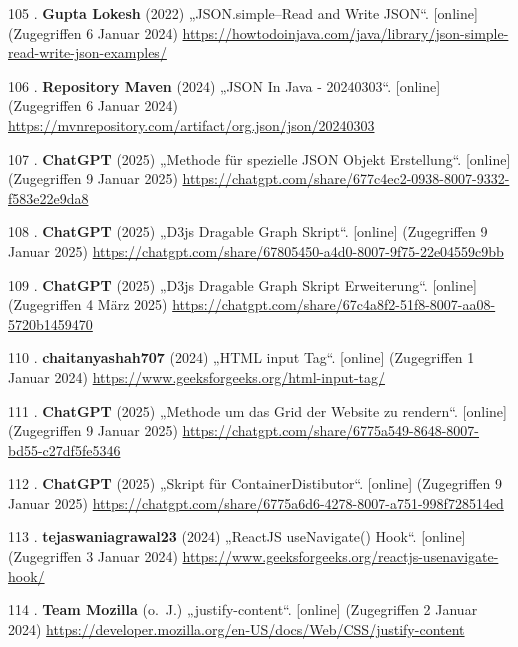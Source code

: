 \documentclass[
    headings=optiontotocandhead,%
    twoside,
    numbers=noenddot,%
    12pt, %
    titlepage, %
    parskip=full, %
    listof=leveldown, 
    numbers=noenddot, %
    a4paper,DIV=14,
    BCOR=15mm,
]{scrbook}
\newlength{\cslhangindent}
\newenvironment{cslreferences}%
  {\setlength{\parindent}{0pt}%
  \everypar{\setlength{\hangindent}{\cslhangindent}}\ignorespaces}%
  {\par}
\begin{document}
\begin{cslreferences}
\leavevmode\hypertarget{ref-HowToDoInJava-JSON}{}%
105 . \textbf{Gupta Lokesh} (2022) „JSON.simple--Read and Write JSON``.
{[}online{]} (Zugegriffen 6 Januar 2024)
\url{https://howtodoinjava.com/java/library/json-simple-read-write-json-examples/}

\leavevmode\hypertarget{ref-MavenRepository-JSON}{}%
106 . \textbf{Repository Maven} (2024) „JSON In Java - 20240303``.
{[}online{]} (Zugegriffen 6 Januar 2024)
\url{https://mvnrepository.com/artifact/org.json/json/20240303}

\leavevmode\hypertarget{ref-gpt-SpecificJson}{}%
107 . \textbf{ChatGPT} (2025) „Methode für spezielle JSON Objekt
Erstellung``. {[}online{]} (Zugegriffen 9 Januar 2025)
\url{https://chatgpt.com/share/677c4ec2-0938-8007-9332-f583e22e9da8}

\leavevmode\hypertarget{ref-gpt-D3jsDGScript}{}%
108 . \textbf{ChatGPT} (2025) „D3js Dragable Graph Skript``.
{[}online{]} (Zugegriffen 9 Januar 2025)
\url{https://chatgpt.com/share/67805450-a4d0-8007-9f75-22e04559c9bb}

\leavevmode\hypertarget{ref-gpt-D3jsDGScript-Erweiterung}{}%
109 . \textbf{ChatGPT} (2025) „D3js Dragable Graph Skript Erweiterung``.
{[}online{]} (Zugegriffen 4 März 2025)
\url{https://chatgpt.com/share/67c4a8f2-51f8-8007-aa08-5720b1459470}

\leavevmode\hypertarget{ref-GeeksForGeeks-HTMLInputTag}{}%
110 . \textbf{chaitanyashah707} (2024) „HTML input Tag``. {[}online{]}
(Zugegriffen 1 Januar 2024)
\url{https://www.geeksforgeeks.org/html-input-tag/}

\leavevmode\hypertarget{ref-gpt-renderGrid}{}%
111 . \textbf{ChatGPT} (2025) „Methode um das Grid der Website zu
rendern``. {[}online{]} (Zugegriffen 9 Januar 2025)
\url{https://chatgpt.com/share/6775a549-8648-8007-bd55-c27df5fe5346}

\leavevmode\hypertarget{ref-gpt-ContainerDistributorScript}{}%
112 . \textbf{ChatGPT} (2025) „Skript für ContainerDistibutor``.
{[}online{]} (Zugegriffen 9 Januar 2025)
\url{https://chatgpt.com/share/6775a6d6-4278-8007-a751-998f728514ed}

\leavevmode\hypertarget{ref-GeeksForGeeks-useNavigate}{}%
113 . \textbf{tejaswaniagrawal23} (2024) „ReactJS useNavigate() Hook``.
{[}online{]} (Zugegriffen 3 Januar 2024)
\url{https://www.geeksforgeeks.org/reactjs-usenavigate-hook/}

\leavevmode\hypertarget{ref-DeveloperMozilla-JustifyContent}{}%
114 . \textbf{Team Mozilla} (o.~J.) „justify-content``. {[}online{]}
(Zugegriffen 2 Januar 2024)
\url{https://developer.mozilla.org/en-US/docs/Web/CSS/justify-content}


\end{cslreferences}
\end{document}
